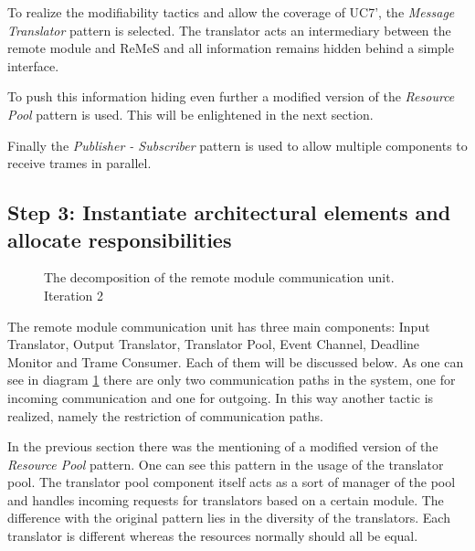 \npar To realize the modifiability tactics and allow the coverage of UC7', the
\emph{Message Translator} pattern is selected. The translator acts an
intermediary between the remote module and ReMeS and all information remains
hidden behind a simple interface. 

\npar To push this information hiding even further a modified version of the
\emph{Resource Pool} pattern is used. This will be enlightened in the next
section.

\npar Finally the \emph{Publisher - Subscriber} pattern is used to allow
multiple components to receive trames in parallel. 

\subsection{Step 3: Instantiate architectural elements and allocate responsibilities}
\label{add:it2/elements}

\begin{figure}[H]
	\begin{centering}
		\caption{The decomposition of the remote module communication unit. Iteration
		2}
		\label{fig:add/it2/decomposition}
	\end{centering}
\end{figure}

\npar The remote module communication unit has three main components: Input
Translator, Output Translator, Translator Pool, Event Channel, Deadline Monitor
and Trame Consumer. Each of them will be discussed below. As one can see in
diagram \ref{fig:add/it2/decomposition} there are only two communication paths
in the system, one for incoming communication and one for outgoing. In this way
another tactic is realized, namely the restriction of communication paths.

\npar In the previous section there was the mentioning of a modified version of
the \emph{Resource Pool} pattern. One can see this pattern in the usage of the
translator pool. The translator pool component itself acts as a sort of manager
of the pool and handles incoming requests for translators based on a
certain module. The difference with the original pattern lies in the 
diversity of the translators. Each translator is different whereas the
resources normally should all be equal. 

